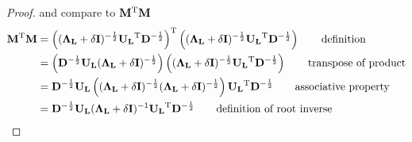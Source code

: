 \begin{proof}
and compare to $\bM\T \bM$
\begin{align}
\bM \T \bM 	&= \left((\bLL + \delta \bI)\neghalfpow \bUL\T \bD\neghalfpow 	\right)\T   \left((\bLL + \delta \bI)\neghalfpow \bUL\T \bD\neghalfpow	\right) 	\tag*{definition}\\
			&= \left(\bD\neghalfpow \bUL (\bLL + \delta \bI)\neghalfpow 	\right)  \left((\bLL + \delta \bI)\neghalfpow \bUL\T \bD\neghalfpow		\right)		\tag*{transpose of product}\\
			&= \bD\neghalfpow \bUL \left( (\bLL + \delta \bI)\neghalfpow 	(\bLL + \delta \bI)\neghalfpow \right)	\bUL\T \bD\neghalfpow						\tag*{associative property}\\
			&= \bD\neghalfpow \bUL (\bLL + \delta \bI)\inv \bUL\T \bD\neghalfpow																				\tag*{definition of root inverse}
\end{align}
\end{proof}


